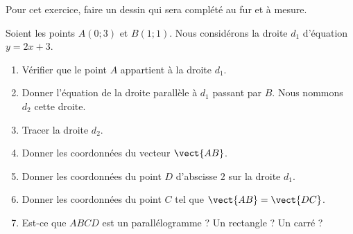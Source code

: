 
\begin{exercice}[\ldots/5]\label{exosmath-0694}

    Pour cet exercice, faire un dessin qui sera complété au fur et à mesure.

    Soient les points \( A(0;3)\) et \( B(1;1)\). Nous considérons la droite \( d_1\) d'équation \( y=2x+3\).
    \begin{multicols}{2}
    \begin{enumerate}
        \item
            Vérifier que le point \( A\) appartient à la droite \( d_1\).
        \item
            Donner l'équation de la droite parallèle à \( d_1\) passant par \( B\). Nous nommons \( d_2\) cette droite.
        \item
            Tracer la droite \( d_2\).
        \item
            Donner les coordonnées du vecteur \( \vect{ AB }\).
        \item
            Donner les coordonnées du point \( D\) d'abscisse \( 2\) sur la droite \( d_1\).
        \item
            Donner les coordonnées du point \( C\) tel que \( \vect{ AB }=\vect{ DC }\).
        \item
            Est-ce que \( ABCD\) est un parallélogramme ? Un rectangle ? Un carré ?
    \end{enumerate}
    \end{multicols}

\end{exercice}
